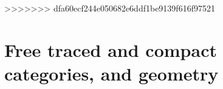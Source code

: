 \documentclass[12pt,oneside,article,draft]{memoir}
\begin{document}
\begin{enumerate}
%
%
%
%
%
%
%


>>>>>>> dfa60ecf244e050682e6ddf1be9139f616f97521
\section{Free traced and compact categories, and geometry}\label{sec:free and geometry}


\end{enumerate}
\end{document}
